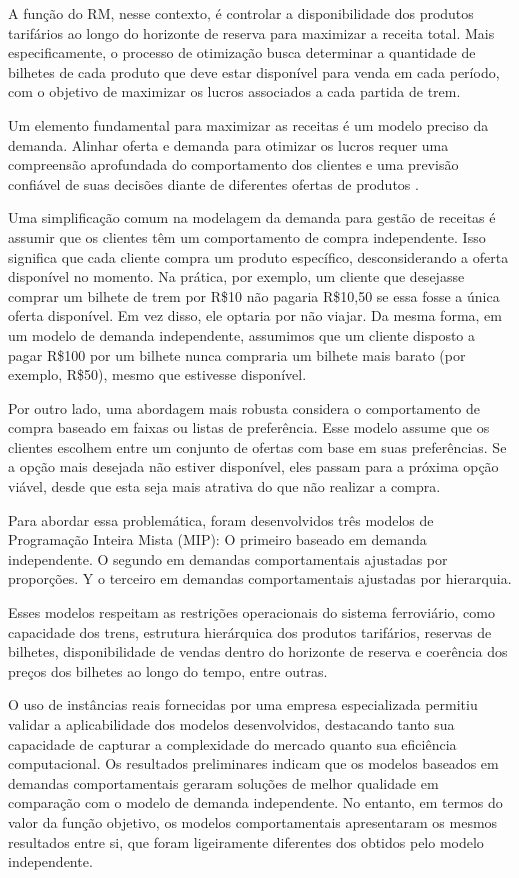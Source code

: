 A função do RM, nesse contexto, é controlar a disponibilidade dos produtos tarifários ao longo do horizonte de reserva para maximizar a receita total. Mais especificamente, o processo de otimização busca determinar a quantidade de bilhetes de cada produto que deve estar disponível para venda em cada período, com o objetivo de maximizar os lucros associados a cada partida de trem.

Um elemento fundamental para maximizar as receitas é um modelo preciso da demanda. Alinhar oferta e demanda para otimizar os lucros requer uma compreensão aprofundada do comportamento dos clientes e uma previsão confiável de suas decisões diante de diferentes ofertas de produtos \citep{ZHAO2019776}.

Uma simplificação comum na modelagem da demanda para gestão de receitas é assumir que os clientes têm um comportamento de compra independente. Isso significa que cada cliente compra um produto específico, desconsiderando a oferta disponível no momento. Na prática, por exemplo, um cliente que desejasse comprar um bilhete de trem por R\$10 não pagaria R\$10,50 se essa fosse a única oferta disponível. Em vez disso, ele optaria por não viajar. Da mesma forma, em um modelo de demanda independente, assumimos que um cliente disposto a pagar R\$100 por um bilhete nunca compraria um bilhete mais barato (por exemplo, R\$50), mesmo que estivesse disponível.

Por outro lado, uma abordagem mais robusta considera o comportamento de compra baseado em faixas ou listas de preferência. Esse modelo assume que os clientes escolhem entre um conjunto de ofertas com base em suas preferências. Se a opção mais desejada não estiver disponível, eles passam para a próxima opção viável, desde que esta seja mais atrativa do que não realizar a compra.

Para abordar essa problemática, foram desenvolvidos três modelos de Programação Inteira Mista (MIP): O primeiro baseado em demanda independente. O segundo em demandas comportamentais ajustadas por proporções. Y o terceiro em demandas comportamentais ajustadas por hierarquia.

Esses modelos respeitam as restrições operacionais do sistema ferroviário, como capacidade dos trens, estrutura hierárquica dos produtos tarifários, reservas de bilhetes, disponibilidade de vendas dentro do horizonte de reserva e coerência dos preços dos bilhetes ao longo do tempo, entre outras.

O uso de instâncias reais fornecidas por uma empresa especializada permitiu validar a aplicabilidade dos modelos desenvolvidos, destacando tanto sua capacidade de capturar a complexidade do mercado quanto sua eficiência computacional. Os resultados preliminares indicam que os modelos baseados em demandas comportamentais geraram soluções de melhor qualidade em comparação com o modelo de demanda independente. No entanto, em termos do valor da função objetivo, os modelos comportamentais apresentaram os mesmos resultados entre si, que foram ligeiramente diferentes dos obtidos pelo modelo independente.

